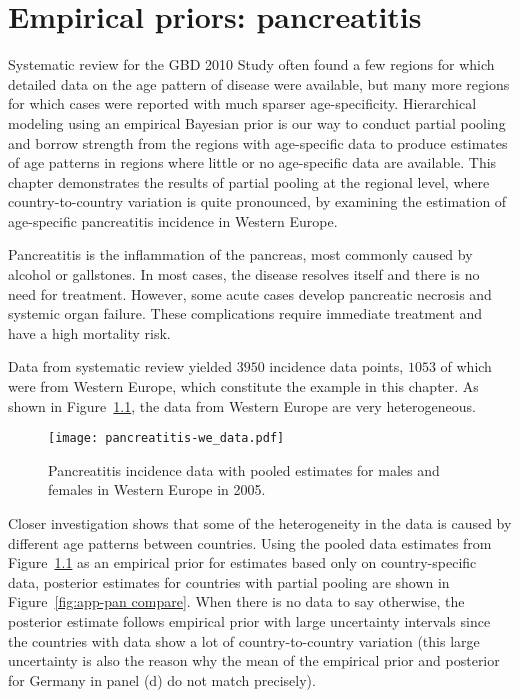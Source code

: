 \chapter{Empirical priors: pancreatitis}
\label{applications-priors_empirical}

Systematic review for the GBD 2010 Study often found a few regions for
which detailed data on the age pattern of disease were available, but
many more regions for which cases were reported with much sparser
age-specificity.  Hierarchical modeling using an empirical Bayesian
prior is our way to conduct partial pooling and borrow strength from
the regions with age-specific data to produce estimates of age
patterns in regions where little or no age-specific data are
available.  This chapter demonstrates the results of partial pooling
at the regional level, where country-to-country variation is quite
pronounced, by examining the estimation of age-specific pancreatitis
incidence in Western Europe.

Pancreatitis is the inflammation of the pancreas, most commonly
caused by alcohol or gallstones.  In most cases, the disease resolves
itself and there is no need for treatment.  However, some acute
cases develop pancreatic necrosis and systemic organ failure.  These
complications require immediate treatment and have a high mortality risk.
\cite{raraty_acute_2004, banks_epidemiology_2002, sekimoto_jpn_2006}

Data from systematic review yielded $3950$ incidence data points,
$1053$ of which were from Western Europe, which constitute the example
in this chapter.  As shown in Figure~\ref{fig:app-pan data}, the data
from Western Europe are very heterogeneous.

    \begin{figure}[h]
        \begin{center}
            \texttt{[image: pancreatitis-we\_data.pdf]}
            \caption{Pancreatitis incidence data
              with pooled estimates for males and females in Western Europe in 2005.}
            \label{fig:app-pan data}
        \end{center}
    \end{figure}

Closer investigation shows that some of the heterogeneity in the data
is caused by different age patterns between countries.  Using the
pooled data estimates from Figure~\ref{fig:app-pan data} as an
empirical prior for estimates based only on country-specific data,
posterior estimates for countries with partial pooling are shown in
Figure~\ref{fig:app-pan compare}.  When there is no data to say
otherwise, the posterior estimate follows empirical prior with large
uncertainty intervals since the countries with data show a lot of
country-to-country variation (this large uncertainty is also the
reason why the mean of the empirical prior and posterior for Germany
in panel (d) do not match precisely).

